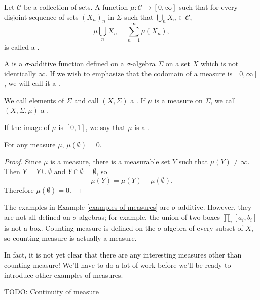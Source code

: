 \begin{definition}
Let $\mathcal C$ be a collection of sets.
A function $\mu: \mathcal C \to [0, \infty]$ such that for every disjoint sequence of sets $(X_n)_n$ in $\Sigma$ such that $\bigcup_n X_n \in \mathcal C$,
\[\mu\bigcup_n X_n = \sum_{n=1}^\infty \mu(X_n),\]
is called a .
\end{definition}

\begin{definition}
A  is a $\sigma$-additive function defined on a $\sigma$-algebra $\Sigma$ on a set $X$ which is not identically $\infty$.
If we wish to emphasize that the codomain of a measure is $[0, \infty]$, we will call it a .

We call elements of $\Sigma$  and call $(X, \Sigma)$ a .
If $\mu$ is a measure on $\Sigma$, we call $(X, \Sigma, \mu)$ a .

If the image of $\mu$ is $[0, 1]$, we say that $\mu$ is a .
\end{definition}

\begin{lemma}
\label{empty set is null}
For any measure $\mu$, $\mu(\emptyset) = 0$.
\end{lemma}
\begin{proof}
Since $\mu$ is a measure, there is a measurable set $Y$ such that $\mu(Y) \neq \infty$.
Then $Y = Y \cup \emptyset$ and $Y \cap \emptyset = \emptyset$, so
\[\mu(Y) = \mu(Y) + \mu(\emptyset).\]
Therefore $\mu(\emptyset) = 0$.
\end{proof}

\begin{example}
The examples in Example \ref{examples of measures} are $\sigma$-additive.
However, they are not all defined on $\sigma$-algebras; for example, the union of two boxes $\prod_i [a_i, b_i]$ is not a box.
Counting measure is defined on the $\sigma$-algebra of every subset of $X$, so counting measure is actually a measure.

In fact, it is not yet clear that there are any interesting measures other than counting measure!
We'll have to do a lot of work before we'll be ready to introduce other examples of measures.
\end{example}

\begin{theorem}
TODO: Continuity of measure
\end{theorem}


